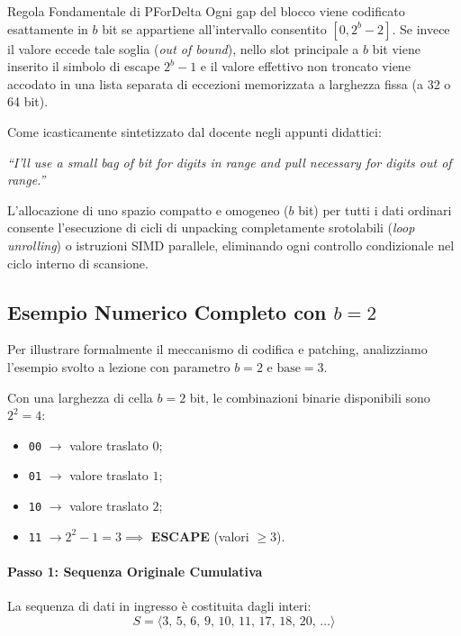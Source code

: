 \begin{alertblock}{Regola Fondamentale di PForDelta}
Ogni gap del blocco viene codificato esattamente in $b$ bit se appartiene all'intervallo consentito $[0, 2^b - 2]$. Se invece il valore eccede tale soglia (\textit{out of bound}), nello slot principale a $b$ bit viene inserito il simbolo di escape $2^b - 1$ e il valore effettivo non troncato viene accodato in una lista separata di eccezioni memorizzata a larghezza fissa (a 32 o 64 bit).
\end{alertblock}

Come icasticamente sintetizzato dal docente negli appunti didattici:
\begin{center}
  \textit{``I'll use a small bag of bit for digits in range and pull necessary for digits out of range.''}
\end{center}
L'allocazione di uno spazio compatto e omogeneo ($b$ bit) per tutti i dati ordinari consente l'esecuzione di cicli di unpacking completamente srotolabili (\textit{loop unrolling}) o istruzioni SIMD parallele, eliminando ogni controllo condizionale nel ciclo interno di scansione.

\FloatBarrier
\subsection{Esempio Numerico Completo con $b = 2$}
\label{subsec:esempio-pfordelta}

Per illustrare formalmente il meccanismo di codifica e patching, analizziamo l'esempio svolto a lezione con parametro $b = 2$ e $\text{base} = 3$.

Con una larghezza di cella $b = 2$ bit, le combinazioni binarie disponibili sono $2^2 = 4$:
\begin{itemize}
  \item \texttt{00} $\rightarrow$ valore traslato $0$;
  \item \texttt{01} $\rightarrow$ valore traslato $1$;
  \item \texttt{10} $\rightarrow$ valore traslato $2$;
  \item \texttt{11} $\rightarrow 2^2 - 1 = 3 \implies$ \textbf{ESCAPE} (valori $\ge 3$).
\end{itemize}

\paragraph{Passo 1: Sequenza Originale Cumulativa}
La sequenza di dati in ingresso \`e costituita dagli interi:
\begin{equation}
  S = \langle 3, \, 5, \, 6, \, 9, \, 10, \, 11, \, 17, \, 18, \, 20, \, \dots \rangle
\end{equation}

